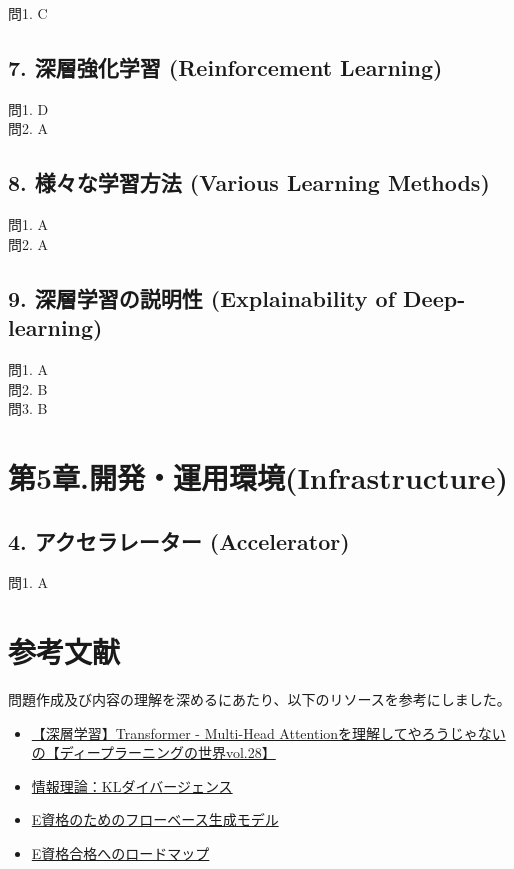 \documentclass[
  letterpaper,
  DIV=11,
  numbers=noendperiod]{scrreprt}
\providecommand{\tightlist}{%
  \setlength{\itemsep}{0pt}\setlength{\parskip}{0pt}}
\begin{document}
問1. C

\section{7. 深層強化学習 (Reinforcement
Learning)}\label{ux6df1ux5c64ux5f37ux5316ux5b66ux7fd2-reinforcement-learning-1}

問1. D\\
問2. A

\section{8. 様々な学習方法 (Various Learning
Methods)}\label{ux69d8ux3005ux306aux5b66ux7fd2ux65b9ux6cd5-various-learning-methods-1}

問1. A\\
問2. A

\section{9. 深層学習の説明性 (Explainability of
Deep-learning)}\label{ux6df1ux5c64ux5b66ux7fd2ux306eux8aacux660eux6027-explainability-of-deep-learning-1}

問1. A\\
問2. B\\
問3. B


\chapter{第5章.開発・運用環境(Infrastructure)}\label{ux7b2c5ux7ae0.ux958bux767aux904bux7528ux74b0ux5883infrastructure-1}

\section{4. アクセラレーター
(Accelerator)}\label{ux30a2ux30afux30bbux30e9ux30ecux30fcux30bfux30fc-accelerator-1}

問1. A


\chapter{参考文献}\label{ux53c2ux8003ux6587ux732e}

問題作成及び内容の理解を深めるにあたり、以下のリソースを参考にしました。

\begin{itemize}
\tightlist
\item
  \href{https://www.youtube.com/watch?v=50XvMaWhiTY}{【深層学習】Transformer
  - Multi-Head
  Attentionを理解してやろうじゃないの【ディープラーニングの世界vol.28】}
\item
  \href{https://note.com/kikaben/n/n1b8b8fa1a0e6}{情報理論：KLダイバージェンス}
\item
  \href{https://engineernoi.hatenablog.com/entry/2024/05/12/233601}{E資格のためのフローベース生成モデル}
\item
  \href{https://ai4mdx.com/index.html}{E資格合格へのロードマップ}
\end{itemize}
\end{document}
